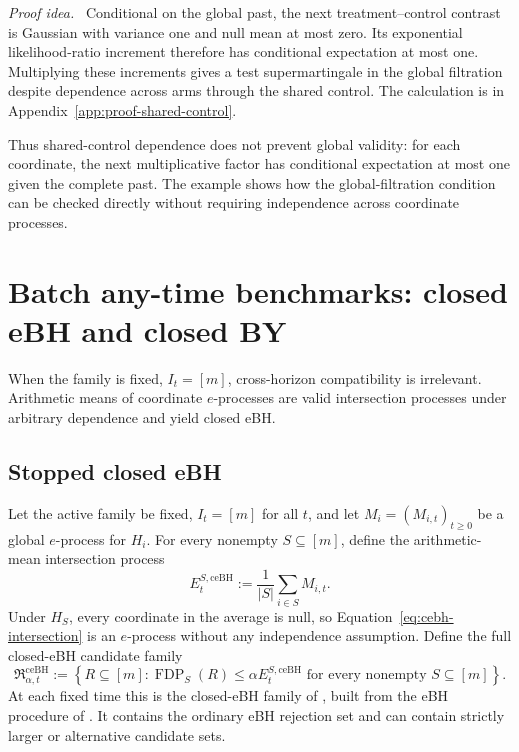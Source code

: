 \documentclass[11pt]{article}
\numberwithin{equation}{section}
\theoremstyle{plain}
\theoremstyle{definition}
\newcommand{\Rfam}{\mathfrak R}
\newcommand{\FDP}{\operatorname{FDP}}
\newcommand{\ceBH}{\mathrm{ceBH}}
\newcommand{\proofidea}{\par\medskip\noindent\textit{Proof idea.}\ }
\begin{document}
\proofidea
Conditional on the global past, the next treatment--control contrast is Gaussian with variance one and null mean at most zero. Its exponential likelihood-ratio increment therefore has conditional expectation at most one. Multiplying these increments gives a test supermartingale in the global filtration despite dependence across arms through the shared control. The calculation is in Appendix~\ref{app:proof-shared-control}.

Thus shared-control dependence does not prevent global validity: for each coordinate, the next multiplicative factor has conditional expectation at most one given the complete past. The example shows how the global-filtration condition can be checked directly without requiring independence across coordinate processes.

\section{Batch any-time benchmarks: closed eBH and closed BY}\label{sec:applications}

When the family is fixed, $I_t=[m]$, cross-horizon compatibility is irrelevant. Arithmetic means of coordinate $e$-processes are valid intersection processes under arbitrary dependence and yield closed eBH. 

\subsection{Stopped closed eBH}\label{sec:closed-ebh}

Let the active family be fixed, $I_t=[m]$ for all $t$, and let $M_i=(M_{i,t})_{t\geq0}$ be a global $e$-process for $H_i$. For every nonempty $S\subseteq[m]$, define the arithmetic-mean intersection process
\begin{equation}\label{eq:cebh-intersection}
  E_t^{S,\ceBH}:=\frac1{|S|}\sum_{i\in S}M_{i,t}.
\end{equation}
Under $H_S$, every coordinate in the average is null, so Equation~\eqref{eq:cebh-intersection} is an $e$-process without any independence assumption. Define the full closed-eBH candidate family
\begin{equation}\label{eq:cebh-family}
  \Rfam_{\alpha,t}^{\ceBH}
  :=\left\{R\subseteq[m]:
  \FDP_S(R)\leq\alpha E_t^{S,\ceBH}
  \text{ for every nonempty }S\subseteq[m]\right\}.
\end{equation}
At each fixed time this is the closed-eBH family of \citet{XuEtAl2026Closure}, built from the eBH procedure of \citet{WangRamdas2022}. It contains the ordinary eBH rejection set and can contain strictly larger or alternative candidate sets.
\end{document}
